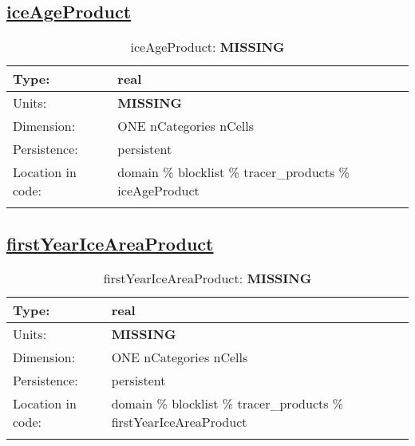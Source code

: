 \subsection[iceAgeProduct]{\hyperref[sec:var_tab_tracer_products]{iceAgeProduct}}
\label{subsec:var_sec_tracer_products_iceAgeProduct}
\begin{center}
\begin{longtable}{| p{2.0in} | p{4.0in} |}
        \hline 
        Type: & real \\
        \hline 
        Units: & {\bf \color{red} MISSING} \\
        \hline 
        Dimension: & ONE nCategories nCells \\
        \hline 
        Persistence: & persistent \\
        \hline 
         Location in code: & domain \% blocklist \% tracer\_products \% iceAgeProduct \\
         \hline 
    \caption{iceAgeProduct: {\bf \color{red} MISSING}}
\end{longtable}
\end{center}
\subsection[firstYearIceAreaProduct]{\hyperref[sec:var_tab_tracer_products]{firstYearIceAreaProduct}}
\label{subsec:var_sec_tracer_products_firstYearIceAreaProduct}
\begin{center}
\begin{longtable}{| p{2.0in} | p{4.0in} |}
        \hline 
        Type: & real \\
        \hline 
        Units: & {\bf \color{red} MISSING} \\
        \hline 
        Dimension: & ONE nCategories nCells \\
        \hline 
        Persistence: & persistent \\
        \hline 
         Location in code: & domain \% blocklist \% tracer\_products \% firstYearIceAreaProduct \\
         \hline 
    \caption{firstYearIceAreaProduct: {\bf \color{red} MISSING}}
\end{longtable}
\end{center}
